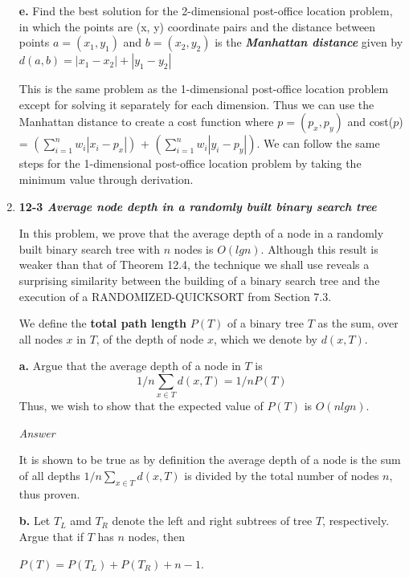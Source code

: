 \documentclass{article}
\begin{document}
\begin{enumerate}
\newpage

\subitem \textbf{e.} Find the best solution for the 2-dimensional post-office location problem, in which the points are (x, y) coordinate pairs and the distance between points $a = (x_1, y_1)$ and $b = (x_2, y_2)$ is the \textbf{\textit{Manhattan distance}} given by $d(a, b) = |x_1 - x_2| + |y_1 - y_2|$

This is the same problem as the 1-dimensional post-office location problem except for solving it separately for each dimension. Thus we can use the Manhattan distance to create a cost function where $p = (p_x, p_y)$ and cost($p$) = $(\sum_{i = 1}^{n} w_i |x_i - p_x|)$ + $(\sum_{i = 1}^{n} w_i |y_i - p_y|)$. We can follow the same steps for the 1-dimensional post-office location problem by taking the minimum value through derivation.

\newpage

\item \textbf{12-3 \textit{Average node depth in a randomly built binary search tree}}

In this problem, we prove that the average depth of a node in a randomly built binary search tree with $n$ nodes is $O(lgn)$. Although this result is weaker than that of Theorem 12.4, the technique we shall use reveals a surprising similarity between the building of a binary search tree and the execution of a RANDOMIZED-QUICKSORT from Section 7.3.
	
\hspace{10mm} We define the \textbf{total path length} $P(T)$ of a binary tree $T$ as the sum, over all nodes $x$ in $T$, of the depth of node $x$, which we denote by $d(x, T)$.

\subitem \textbf{a.} Argue that the average depth of a node in $T$ is $$1/n \sum_{x \in T} d(x, T) = 1/n P(T)$$ \hspace{11mm}Thus, we wish to show that the expected value of $P(T)$ is $O(nlgn)$. 

{\textit{Answer}} 

It is shown to be true as by definition the average depth of a node is the sum of all depths $1/n \sum_{x \in T} d(x, T)$ is divided by the total number of nodes $n$, thus proven.

\newpage

\subitem \textbf{b.} Let $T_L$ amd $T_R$ denote the left and right subtrees of tree $T$, respectively. Argue that if $T$ has $n$ nodes, then 

$P(T) = P(T_L) + P(T_R) + n - 1$. 


\end{enumerate}
\end{document}
